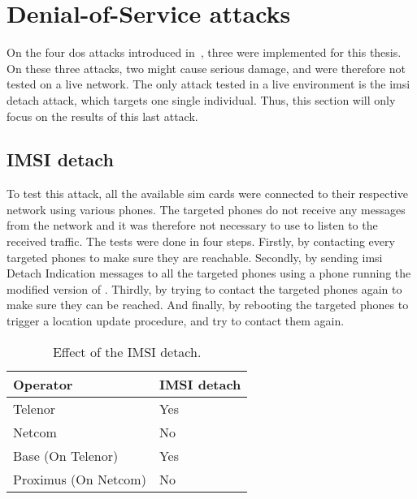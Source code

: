   \section{Denial-of-Service attacks}

    On the four \gls{dos} attacks introduced in~,
    three were implemented for this thesis. On these three attacks, two
    might cause serious damage, and were therefore not tested on a live
    network. The only attack tested in a live environment is the
    \gls{imsi} detach attack, which targets one single individual. Thus,
    this section will only focus on the results of this last attack.

    \subsection{IMSI detach}

      To test this attack, all the available \gls{sim} cards were
      connected to their respective network using various phones. The
      targeted phones do not receive any messages from the network and
      it was therefore not necessary to use  to listen
      to the received traffic. The tests were done in four steps.
      Firstly, by contacting every targeted phones to make sure they are
      reachable. Secondly, by sending \gls{imsi} Detach Indication
      messages to all the targeted phones using a phone running the
      modified version of . Thirdly, by trying to
      contact the targeted phones again to make sure they can be
      reached. And finally, by rebooting the targeted phones to trigger
      a location update procedure, and try to contact them again.

      \begin{table}[h]
        \centering
        \begin{tabular}{@{}ll@{}}
          \toprule
          Operator             & IMSI detach\\
          \midrule
          Telenor              & Yes  \\
          Netcom               & No   \\
          Base (On Telenor)    & Yes  \\            
          Proximus (On Netcom) & No   \\
          \bottomrule
        \end{tabular}
        \caption{Effect of the IMSI detach.}
        \label{tab:imsi_detach}
      \end{table}

